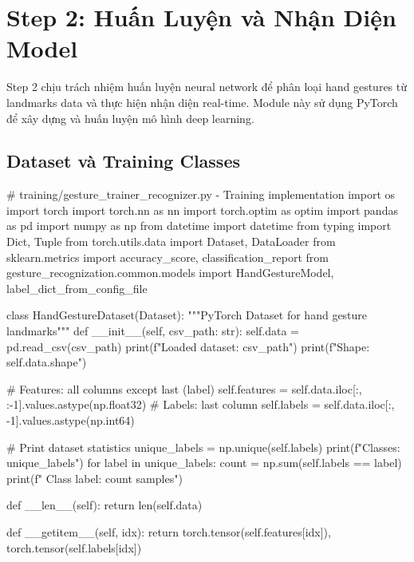 
\section{Step 2: Huấn Luyện và Nhận Diện Model}

Step 2 chịu trách nhiệm huấn luyện neural network để phân loại hand gestures từ landmarks data và thực hiện nhận diện real-time. Module này sử dụng PyTorch để xây dựng và huấn luyện mô hình deep learning.

\subsection{Dataset và Training Classes}

\begin{aivncodebox}
\begin{python}
# training/gesture_trainer_recognizer.py - Training implementation
import os
import torch
import torch.nn as nn
import torch.optim as optim
import pandas as pd
import numpy as np
from datetime import datetime
from typing import Dict, Tuple
from torch.utils.data import Dataset, DataLoader
from sklearn.metrics import accuracy_score, classification_report
from gesture_recognization.common.models import HandGestureModel, label_dict_from_config_file

class HandGestureDataset(Dataset):
    """PyTorch Dataset for hand gesture landmarks"""
    def __init__(self, csv_path: str):
        self.data = pd.read_csv(csv_path)
        print(f"Loaded dataset: {csv_path}")
        print(f"Shape: {self.data.shape}")
        
        # Features: all columns except last (label)
        self.features = self.data.iloc[:, :-1].values.astype(np.float32)
        # Labels: last column
        self.labels = self.data.iloc[:, -1].values.astype(np.int64)
        
        # Print dataset statistics
        unique_labels = np.unique(self.labels)
        print(f"Classes: {unique_labels}")
        for label in unique_labels:
            count = np.sum(self.labels == label)
            print(f"  Class {label}: {count} samples")
    
    def __len__(self):
        return len(self.data)
    
    def __getitem__(self, idx):
        return torch.tensor(self.features[idx]), torch.tensor(self.labels[idx])


\end{python}
\end{aivncodebox}
